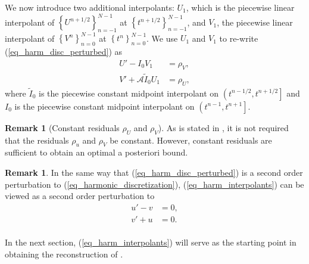 \documentclass[12pt,a4paper]{article}
\numberwithin{equation}{section}
\theoremstyle{definition}
\newcommand{\qpb}[1]{\left(#1\right]}
\newcommand{\bracegs}[1]{\left\lbrace#1\right\rbrace}
\newtheorem{Rem}[subsection]{Remark}
\begin{document}
We now introduce two additional interpolants: $U_1$, which is the piecewise linear interpolant of $\bracegs{U^{n+1/2}}_{n=-1}^{N-1}$  at $\bracegs{t^{n+1/2}}_{n=-1}^{N-1}$, and $V_1$, the piecewise linear interpolant of $\bracegs{V^{n}}_{n=0}^{N-1}$ at $\bracegs{t^{n}}_{n=0}^{N-1}$. We use $U_1$ and $V_1$ to re-write (\ref{eq_harm_disc_perturbed}) as
\begin{equation}\label{eq_harm_interpolants}
\begin{aligned}
U'-I_0V_1&=\rho_V,\\
V'+ \mathcal{A}\tilde{I}_0U_1&=\rho_U,
\end{aligned}
\end{equation}
where $\tilde{I}_0$ is the piecewise constant midpoint interpolant on $\qpb{t^{n-1/2}, t^{n+1/2}}$ and ${I}_0$ is the piecewise constant midpoint interpolant on $\qpb{t^{n-1}, t^{n+1}}$. 
\begin{Rem}[Constant residuals $\rho_U$ and $\rho_V$]
As is stated in \cite{georgoulis2016posteriori},  it is not required that the  residuals $\rho_u$ and $\rho_V$ be constant.  However,  constant residuals are sufficient to obtain an optimal a posteriori bound.
\end{Rem}

 
\begin{Rem}\label{Rem_opt_perturbation_cont}
In the same way that (\ref{eq_harm_disc_perturbed}) is a second order perturbation to (\ref{eq_harmonic_discretization}), (\ref{eq_harm_interpolants}) can be viewed as a second order perturbation to
\begin{equation}\label{eq_harmonic_perturbed}
\begin{aligned}
u'- v &= 0,\\
v' +u &= 0.\\
\end{aligned}
\end{equation}
\end{Rem}
In the next section,  (\ref{eq_harm_interpolants}) will serve as the starting point in obtaining the reconstruction of \cite{georgoulis2016posteriori}.
\end{document}
